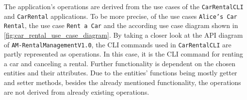 The application's operations are derived from the use cases of the \texttt{CarRentalCLI} and \texttt{CarRental} applications.
To be more precise, of the use cases \texttt{Alice's Car Rental}, the use case \texttt{Rent a Car} and the according use case diagram shown in \autoref*{fig:car_rental_use_case_diagram}.
By taking a closer look at the API diagram of \texttt{AM-RentalManagementV1.0}, the CLI commands used in \texttt{CarRentalCLI} are partly represented as operations.
In this case, it is the CLI command for renting a car and canceling a rental.
Further functionality is dependent on the chosen entities and their attributes.
Due to the entities' functions being mostly getter and setter methods, besides the already mentioned functionality, the operations are not derived from already existing operations.